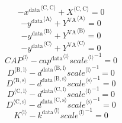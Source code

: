 \begin{equation}
-{x^{\mathrm{data}}}^{\langle \mathrm{\mathrm{C}},\mathrm{\mathrm{C}}\rangle} + {X}^{\langle \mathrm{C},\mathrm{C}\rangle} = 0
\end{equation}
\begin{equation}
-{y^{\mathrm{data}}}^{\langle \mathrm{\mathrm{A}}\rangle} + {Y^{\mathrm{VA}}}^{\langle \mathrm{A}\rangle} = 0
\end{equation}
\begin{equation}
-{y^{\mathrm{data}}}^{\langle \mathrm{\mathrm{B}}\rangle} + {Y^{\mathrm{VA}}}^{\langle \mathrm{B}\rangle} = 0
\end{equation}
\begin{equation}
-{y^{\mathrm{data}}}^{\langle \mathrm{\mathrm{C}}\rangle} + {Y^{\mathrm{VA}}}^{\langle \mathrm{C}\rangle} = 0
\end{equation}
\begin{equation}
{{C\!A\!P}}^{\langle \mathrm{l}\rangle} - {{{c\!a\!p}^{\mathrm{data}}}^{\langle \mathrm{\mathrm{l}}\rangle}} {{{s\!c\!a\!l\!e}}^{\langle \mathrm{\mathrm{l}}\rangle}}^{-1} = 0
\end{equation}
\begin{equation}
{D}^{\langle \mathrm{B},\mathrm{l}\rangle} - {{d^{\mathrm{data}}}^{\langle \mathrm{\mathrm{B}},\mathrm{\mathrm{l}}\rangle}} {{{s\!c\!a\!l\!e}}^{\langle \mathrm{\mathrm{l}}\rangle}}^{-1} = 0
\end{equation}
\begin{equation}
{D}^{\langle \mathrm{B},\mathrm{s}\rangle} - {{d^{\mathrm{data}}}^{\langle \mathrm{\mathrm{B}},\mathrm{\mathrm{s}}\rangle}} {{{s\!c\!a\!l\!e}}^{\langle \mathrm{\mathrm{s}}\rangle}}^{-1} = 0
\end{equation}
\begin{equation}
{D}^{\langle \mathrm{C},\mathrm{l}\rangle} - {{d^{\mathrm{data}}}^{\langle \mathrm{\mathrm{C}},\mathrm{\mathrm{l}}\rangle}} {{{s\!c\!a\!l\!e}}^{\langle \mathrm{\mathrm{l}}\rangle}}^{-1} = 0
\end{equation}
\begin{equation}
{D}^{\langle \mathrm{C},\mathrm{s}\rangle} - {{d^{\mathrm{data}}}^{\langle \mathrm{\mathrm{C}},\mathrm{\mathrm{s}}\rangle}} {{{s\!c\!a\!l\!e}}^{\langle \mathrm{\mathrm{s}}\rangle}}^{-1} = 0
\end{equation}
\begin{equation}
{K}^{\langle \mathrm{l}\rangle} - {{k^{\mathrm{data}}}^{\langle \mathrm{\mathrm{l}}\rangle}} {{{s\!c\!a\!l\!e}}^{\langle \mathrm{\mathrm{l}}\rangle}}^{-1} = 0
\end{equation}
